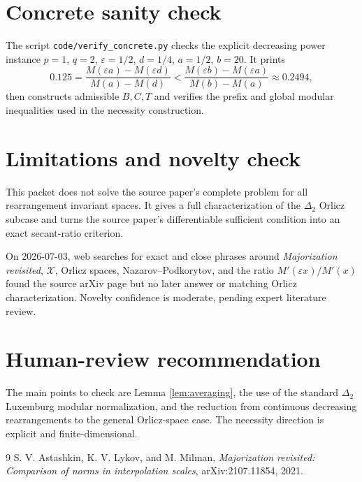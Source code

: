 \documentclass[11pt]{article}
\newcommand{\Xclass}{\mathcal X}
\newcommand{\eps}{\varepsilon}
\begin{document}
\section*{Concrete sanity check}

The script \texttt{code/verify\_concrete.py} checks the explicit decreasing
power instance $p=1$, $q=2$, $\eps=1/2$, $d=1/4$, $a=1/2$, $b=20$. It prints
\[
0.125=
\frac{M(\eps a)-M(\eps d)}{M(a)-M(d)}
<
\frac{M(\eps b)-M(\eps a)}{M(b)-M(a)}
\approx 0.2494,
\]
then constructs admissible $B,C,T$ and verifies the prefix and global modular
inequalities used in the necessity construction.

\section*{Limitations and novelty check}

This packet does not solve the source paper's complete problem for all
rearrangement invariant spaces. It gives a full characterization of the
$\Delta_2$ Orlicz subcase and turns the source paper's differentiable
sufficient condition into an exact secant-ratio criterion.

On 2026-07-03, web searches for exact and close phrases around
\emph{Majorization revisited}, $\Xclass$, Orlicz spaces, Nazarov--Podkorytov,
and the ratio $M'(\eps x)/M'(x)$ found the source arXiv page but no later
answer or matching Orlicz characterization. Novelty confidence is moderate,
pending expert literature review.

\section*{Human-review recommendation}

The main points to check are Lemma \ref{lem:averaging}, the use of the
standard $\Delta_2$ Luxemburg modular normalization, and the reduction from
continuous decreasing rearrangements to the general Orlicz-space case. The
necessity direction is explicit and finite-dimensional.

\begin{thebibliography}{9}
S. V. Astashkin, K. V. Lykov, and M. Milman,
\emph{Majorization revisited: Comparison of norms in interpolation scales},
arXiv:2107.11854, 2021.
\end{thebibliography}
\end{document}
